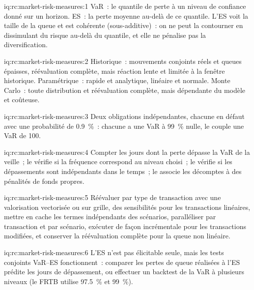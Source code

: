 \begin{solution}{iq:rc:market-risk-measures:1}
VaR~: le quantile de perte à un niveau de confiance donné sur un horizon. ES~: la perte moyenne au-delà de ce
quantile. L'ES voit la taille de la queue et est cohérente (sous-additive)~: on ne peut la contourner en
dissimulant du risque au-delà du quantile, et elle ne pénalise pas la diversification.
\end{solution}

\begin{solution}{iq:rc:market-risk-measures:2}
Historique~: mouvements conjoints réels et queues épaisses, réévaluation complète, mais réaction lente et limitée à
la fenêtre historique. Paramétrique~: rapide et analytique, linéaire et normale. Monte Carlo~: toute distribution et
réévaluation complète, mais dépendante du modèle et coûteuse.
\end{solution}

\begin{solution}{iq:rc:market-risk-measures:3}
Deux obligations indépendantes, chacune en défaut avec une probabilité de 0.9~\%~: chacune a une VaR à 99~\% nulle, le couple une VaR de 100.
\end{solution}

\begin{solution}{iq:rc:market-risk-measures:4}
Compter les jours dont la perte dépasse la VaR de la veille~; le  vérifie si la fréquence correspond
au niveau choisi~; le  vérifie si les dépassements sont indépendants dans le temps~; le  associe les décomptes à des pénalités de fonds propres.
\end{solution}

\begin{solution}{iq:rc:market-risk-measures:5}
Réévaluer par type de transaction avec une valorisation vectorisée ou sur grille, des sensibilités pour les transactions linéaires, mettre en cache
les termes indépendants des scénarios, paralléliser par transaction et par scénario, exécuter de façon incrémentale
pour les transactions modifiées, et conserver la réévaluation complète pour la queue non linéaire.
\end{solution}

\begin{solution}{iq:rc:market-risk-measures:6}
L'ES n'est pas élicitable seule, mais les tests conjoints VaR--ES fonctionnent~: comparer les pertes de queue réalisées
à l'ES prédite les jours de dépassement, ou effectuer un backtest de la VaR à plusieurs niveaux
(le FRTB utilise 97.5~\% et 99~\%).
\end{solution}
